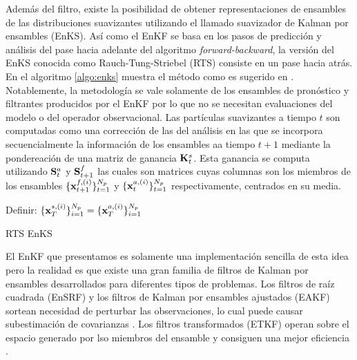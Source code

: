 Además del filtro, existe la posibilidad de obtener representaciones de ensambles de las distribuciones suavizantes utilizando el llamado suavizador de Kalman por ensambles (EnKS). Así como el EnKF se basa en los pasos de predicción y análisis del pase hacia adelante del algoritmo \textit{forward-backward}, la versión del EnKS conocida como Rauch-Tung-Striebel (RTS) consiste en un pase hacia atrás. En el algoritmo \ref{algo:enks} muestra el método como es sugerido en \cite{Cosme2012}. Notablemente, la metodología se vale solamente de los ensambles de pronóstico y filtrantes producidos por el EnKF por lo que no se necesitan evaluaciones del modelo o del operador observacional. Las partículas suavizantes a tiempo $t$ son computadas como una corrección de las del análisis en las que se incorpora secuencialmente la información de los ensambles aa tiempo $t+1$ mediante la pondereación de una matriz de ganancia $\mathbf{K}_t^s$. Esta ganancia se computa utilizando $\mathbf{S}_t^a$ y $\mathbf{S}_{t+1}^f$ las cuales son matrices cuyas columnas son los miembros de los ensambles $\{\mathbf{x}_{t+1}^{f, (i)}\}_{t=1}^{N_p}$ y  $\{\mathbf{x}_t^{a, (i)}\}_{t=1}^{N_p}$ respectivamente, centrados en su media.

\begin{algorithm}[H]\label{algo:enks}
    Definir: $\{\mathbf{x}_T^{s, (i)} \}_{i=1}^{N_p} = \{\mathbf{x}_T^{a, (i)} \}_{i=1}^{N_p}$
    
\caption{RTS EnKS}
\end{algorithm}

El EnKF que presentamos es solamente una implementación sencilla de esta idea pero la realidad es que existe una gran familia de filtros de Kalman por ensambles desarrollados para diferentes tipos de problemas. Los filtros de raíz cuadrada (EnSRF) y los filtros de Kalman por ensambles ajustados (EAKF) sortean necesidad de perturbar las observaciones, lo cual puede causar subestimación de covarianzas \citep{Whitaker2002, Anderson2001}. Los filtros transformados (ETKF) operan sobre el espacio generado por lso miembros del ensamble y consiguen una mejor eficiencia \citep{Bishop2001}.

